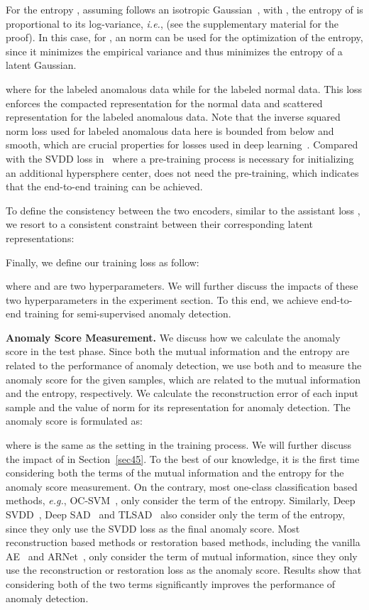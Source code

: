 \documentclass{bmvc2k}
\begin{document}
For the entropy , assuming  follows an isotropic Gaussian~\cite{cover2012elements},  with , the entropy of  is proportional to its log-variance, \emph{i.e.},  (see the supplementary material for the proof). 
In this case, for , an  norm can be used for the optimization of the entropy, since it minimizes the empirical variance and thus minimizes the entropy of a latent Gaussian. 

where  for the labeled anomalous data while  for the labeled normal data. This loss enforces the compacted representation for the normal data and scattered representation for the labeled anomalous data. 
Note that the inverse squared norm loss used for labeled anomalous data here is bounded from below and smooth, which are crucial properties for losses used in deep learning~\cite{Goodfellow2016}.
Compared with the SVDD loss in~\cite{SAD} where a pre-training process is necessary for initializing an additional hypersphere center,  does not need the pre-training, which indicates that the end-to-end training can be achieved. 

To define the consistency between the two encoders, similar to the assistant loss \cite{Akcay2018}, we resort to a consistent constraint between their corresponding latent representations:


\noindent Finally, we define our training loss as follow:

where  and  are two hyperparameters. We will further discuss the impacts of these two hyperparameters in the experiment section. To this end, we achieve end-to-end training for semi-supervised anomaly detection.

\noindent \textbf{Anomaly Score Measurement.}
We discuss how we calculate the anomaly score in the test phase. Since both the mutual information and the entropy are related to the performance of anomaly detection, we use both  and  to measure the anomaly score for the given samples, which are related to the mutual information and the entropy, respectively. 
We calculate the reconstruction error of each input sample  and the value of  norm for its representation  for anomaly detection. The anomaly score is formulated as:

where  is the same as the setting in the training process. We will further discuss the impact of  in Section~\ref{sec45}.
To the best of our knowledge, it is the first time considering both the terms of the mutual information and the entropy for the anomaly score measurement. On the contrary, most one-class classification based methods, \emph{e.g.}, OC-SVM~\cite{scholkopf2001estimating}, only consider the term of the entropy. Similarly, Deep SVDD~\cite{ruff2018deep}, Deep SAD~\cite{SAD} and TLSAD~\cite{TLSAD} also consider only the term of the entropy, since they only use the SVDD loss as the final anomaly score. Most reconstruction based methods or restoration based methods, including the vanilla AE~\cite{masci2011stacked} and ARNet~\cite{fye2020ARNet}, only consider the term of mutual information, since they only use the reconstruction or restoration loss as the anomaly score. Results show that considering both of the two terms significantly improves the performance of anomaly detection.
\end{document}
